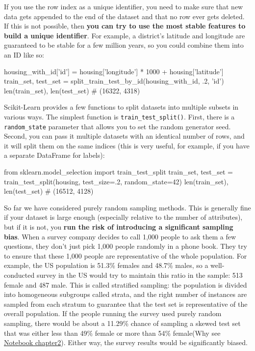 If you use the row index as a unique identifier, you need to make sure that new data
gets appended to the end of the dataset and that no row ever gets deleted. If this is not
possible, then \textbf{you can try to use the most stable features to build a unique identifier}. For example, a district's latitude and longitude are guaranteed to be stable for a few
million years, so you could combine them into an ID like so:

\begin{pyc}
housing_with_id['id'] = housing['longitude'] * 1000 + housing['latitude']
train_set, test_set = split_train_test_by_id(housing_with_id, .2, 'id')
len(train_set), len(test_set)
# (16322, 4318)
\end{pyc}

Scikit-Learn provides a few functions to split datasets into multiple subsets in various
ways. The simplest function is \verb|train_test_split()|. First, there is a \verb|random_state| parameter that allows you to set the random generator
seed. Second, you can pass it multiple datasets with an identical number of rows, and
it will split them on the same indices (this is very useful, for example, if you have a
separate DataFrame for labels):
\begin{pyc}
from sklearn.model_selection import train_test_split
train_set, test_set = train_test_split(housing, test_size=.2, random_state=42)
len(train_set), len(test_set)
# (16512, 4128)
\end{pyc}

So far we have considered purely random sampling methods. This is generally fine if
your dataset is large enough (especially relative to the number of attributes), but if it
is not, you \textbf{run the risk of introducing a significant sampling bias}. When a survey
company decides to call 1,000 people to ask them a few questions, they don't just pick
1,000 people randomly in a phone book. They try to ensure that these 1,000 people
are representative of the whole population. For example, the US population is 51.3\%
females and 48.7\% males, so a well-conducted survey in the US would try to maintain
this ratio in the sample: 513 female and 487 male. This is called stratified sampling:
the population is divided into homogeneous subgroups called strata, and the right
number of instances are sampled from each stratum to guarantee that the test set is
representative of the overall population. If the people running the survey used purely
random sampling, there would be about a 11.29\% chance of sampling a skewed test set that was either less than 49\% female or more than 54\% female(Why see \href{https://github.com/JPL-JUNO/HOML/blob/main/chapter/chapter2.ipynb}{Notebook chapter2}). Either way, the survey results would be significantly biased.


